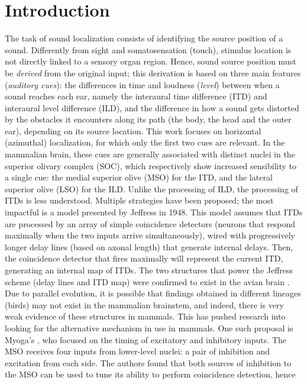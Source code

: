 \documentclass[11pt,a4paper,twocolumn]{article}
\begin{document}


\section{Introduction}\label{sec:introduction}
The task of sound localization consists of identifying the source position of a sound. Differently from sight and somatosensation (touch), stimulus location is not directly linked to a sensory organ region. Hence, sound source position must be \textit{derived} from the original input; this derivation is based on three main features (\textit{auditory cues}): the differences in time and loudness (\textit{level}) between when a sound reaches each ear, namely the interaural time difference (ITD) and interaural level difference (ILD), and the difference in how a sound gets distorted by the obstacles it encounters along its path (the body, the head and the outer ear), depending on its source location. This work focuses on horizontal (azimuthal) localization, for which only the first two cues are relevant. In the mammalian brain, these cues are generally associated with distinct nuclei in the superior olivary complex (SOC), which respectively show increased sensibility to a single cue: the medial superior olive (MSO) for the ITD, and the lateral superior olive (LSO) for the ILD. Unlike the processing of ILD, the processing of ITDs is less understood. Multiple strategies have been proposed; the most impactful is a model presented by Jeffress in 1948. This model assumes that ITDs are processed by an array of simple coincidence detectors (neurons that respond maximally when the two inputs arrive simultaneously), wired with progressively longer delay lines (based on axonal length) that generate internal delays. Then, the coincidence detector that fires maximally will represent the current ITD, generating an internal map of ITDs. The two structures that power the Jeffress scheme (delay lines and ITD map) were confirmed to exist in the avian brain \cite{grotheMechanismsSoundLocalization2010}. Due to parallel evolution, it is possible that findings obtained in different lineages (birds) may not exist in the mammalian brainstem, and indeed, there is very weak evidence of these structures in mammals. This has pushed research into looking for the alternative mechanism in use in mammals. One such proposal is Myoga's \cite{myogaGlycinergicInhibitionTunes2014}, who focused on the timing of excitatory and inhibitory inputs. The MSO receives four inputs from lower-level nuclei: a pair of inhibition and excitation from each side. The authors found that both sources of inhibition to the MSO can be used to tune its ability to perform coincidence detection, hence 
\end{document}
